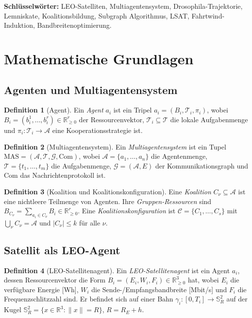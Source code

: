 ﻿\documentclass[a4paper,12pt]{article}
\theoremstyle{definition}
\newtheorem{definition}{Definition}[section]
\newcommand{\R}{\mathbb{R}}
\newcommand{\Rnn}{\mathbb{R}_{\geq 0}}
\newcommand{\calA}{\mathcal{A}}
\newcommand{\calT}{\mathcal{T}}
\newcommand{\calC}{\mathcal{C}}
\newcommand{\calG}{\mathcal{G}}
\begin{document}
\textbf{Schl\"usselw\"orter:}
LEO-Satelliten, Multiagentensystem, Drosophila-Trajektorie, Lemniskate,
Koalitionsbildung, Subgraph Algorithmus, LSAT, Fahrtwind-Induktion, Bandbreitenoptimierung.

\section{Mathematische Grundlagen}
\label{sec:foundations}

\subsection{Agenten und Multiagentensystem}

\begin{definition}[Agent]
Ein \emph{Agent} $a_i$ ist ein Tripel $a_i = (B_i, \calT_i, \pi_i)$, wobei
$B_i = (b_i^1, \ldots, b_i^r) \in \Rnn^r$ der Ressourcenvektor,
$\calT_i \subseteq \calT$ die lokale Aufgabenmenge und
$\pi_i : \calT_i \to \calA$ eine Kooperationsstrategie ist.
\end{definition}

\begin{definition}[Multiagentensystem]
Ein \emph{Multiagentensystem} ist ein Tupel
$\mathrm{MAS} = (\calA, \calT, \calG, \mathrm{Com})$, wobei
$\calA = \{a_1,\ldots,a_n\}$ die Agentenmenge,
$\calT = \{t_1,\ldots,t_m\}$ die Aufgabenmenge,
$\calG = (\calA, E)$ der Kommunikationsgraph und
$\mathrm{Com}$ das Nachrichtenprotokoll ist.
\end{definition}

\begin{definition}[Koalition und Koalitionskonfiguration]
Eine \emph{Koalition} $C_\nu \subseteq \calA$ ist eine nichtleere Teilmenge von Agenten.
Ihre \emph{Gruppen-Ressourcen} sind $B_{C_\nu} = \sum_{a_i \in C_\nu} B_i \in \Rnn^r$.
Eine \emph{Koalitionskonfiguration} ist $\calC = \{C_1,\ldots,C_s\}$ mit
$\bigcup_\nu C_\nu = \calA$ und $|C_\nu| \leq k$ f\"ur alle $\nu$.
\end{definition}

\subsection{Satellit als LEO-Agent}

\begin{definition}[LEO-Satellitenagent]
\label{def:leo_agent}
Ein \emph{LEO-Satellitenagent} ist ein Agent $a_i$, dessen Ressourcenvektor
die Form $B_i = (E_i, W_i, F_i) \in \Rnn^3$ hat, wobei
$E_i$ die verf\"ugbare Energie [Wh],
$W_i$ die Sende-/Empfangsbandbreite [Mbit/s] und
$F_i$ die Frequenzschlitzzahl sind.
Er befindet sich auf einer Bahn $\gamma_i : [0,T_i] \to \mathbb{S}^2_{R}$
auf der Kugel $\mathbb{S}^2_{R} = \{x \in \R^3 : \|x\| = R\}$, $R = R_E + h$.
\end{definition}
\end{document}
